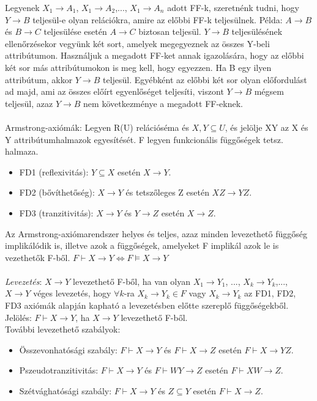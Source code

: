 \documentclass[margin=0px]{article}
\begin{document}
	Legyenek $X_1 \to A_1$, $X_1 \to A_2$,..., $X_1 \to A_n$ adott FF-k, szeretnénk tudni, hogy $Y \to B$ teljesül-e olyan relációkra, amire az előbbi FF-k teljesülnek. Példa: $A \to B$ és $B \to C$ teljesülése esetén $A \to C$ biztosan teljesül. $Y \to B$ teljesülésének ellenőrzésekor vegyünk két sort, amelyek megegyeznek az összes Y-beli attribútumon. Használjuk a megadott FF-ket annak igazolására, hogy az előbbi két sor más attribútumokon is meg kell, hogy egyezzen. Ha B egy ilyen attribútum, akkor $Y \to B$ teljesül. Egyébként az előbbi két sor olyan előfordulást ad majd, ami az összes előírt egyenlőséget teljesíti, viszont $Y \to B$ mégsem teljesül, azaz $Y \to B$ nem következménye a megadott FF-eknek. \\ \\
	Armstrong-axiómák: Legyen R(U) relációséma és $X,Y \subseteq U$, és jelölje XY az X és Y attribútumhalmazok egyesítését. F legyen funkcionális függőségek tetsz. halmaza. \\
	\begin{itemize}
		\item FD1 (reflexivitás): $Y \subseteq X$ esetén $X \to Y$.
		\item FD2 (bővíthetőség): $X \to Y$ és tetszőleges Z esetén $XZ \to YZ$.
		\item FD3 (tranzitivitás): $X \to Y$ és $Y \to Z$ esetén $X \to Z$.		
	\end{itemize}
	Az Armstrong-axiómarendszer helyes és teljes, azaz minden levezethető függőség implikálódik is, illetve azok a függőségek, amelyeket F implikál azok le is vezethetők F-ből. $F \vdash X \to Y \iff F \models X \to Y$\\ \\
	\textit{Levezetés}: $X \to Y$ levezethető F-ből, ha van olyan $X_1 \to Y_1$, ..., $X_k \to Y_k$,..., $X \to Y$ véges levezetés, hogy $\forall k$-ra $X_k \to Y_k \in F$ vagy $X_k \to Y_k$ az FD1, FD2, FD3 axiómák alapján kapható a levezetésben előtte szereplő függőségekből. Jelölés: $F \vdash X \to Y$, ha $X \to Y$ levezethető F-ből. \\
	További levezethető szabályok:
	\begin{itemize}
		\item Összevonhatósági szabály: $F \vdash X \to Y$ és $F \vdash X \to Z$ esetén $F \vdash X \to YZ$.
		\item Pszeudotranzitivitás: $F \vdash X \to Y$ és $F \vdash WY \to Z$ esetén $F \vdash XW \to Z$.
		\item Szétvághatósági szabály: $F \vdash X \to Y$ és $Z \subseteq Y$ esetén $F \vdash X \to Z$.
	\end{itemize}
\end{document}
